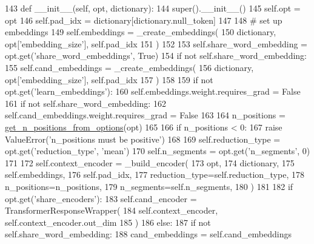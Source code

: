 \begin{DoxyCode}
143     \textcolor{keyword}{def }\_\_init\_\_(self, opt, dictionary):
144         super().\_\_init\_\_()
145         self.opt = opt
146         self.pad\_idx = dictionary[dictionary.null\_token]
147 
148         \textcolor{comment}{# set up embeddings}
149         self.embeddings = \_create\_embeddings(
150             dictionary, opt[\textcolor{stringliteral}{'embedding\_size'}], self.pad\_idx
151         )
152 
153         self.share\_word\_embedding = opt.get(\textcolor{stringliteral}{'share\_word\_embeddings'}, \textcolor{keyword}{True})
154         \textcolor{keywordflow}{if} \textcolor{keywordflow}{not} self.share\_word\_embedding:
155             self.cand\_embeddings = \_create\_embeddings(
156                 dictionary, opt[\textcolor{stringliteral}{'embedding\_size'}], self.pad\_idx
157             )
158 
159         \textcolor{keywordflow}{if} \textcolor{keywordflow}{not} opt.get(\textcolor{stringliteral}{'learn\_embeddings'}):
160             self.embeddings.weight.requires\_grad = \textcolor{keyword}{False}
161             \textcolor{keywordflow}{if} \textcolor{keywordflow}{not} self.share\_word\_embedding:
162                 self.cand\_embeddings.weight.requires\_grad = \textcolor{keyword}{False}
163 
164         n\_positions = \hyperlink{namespaceparlai_1_1agents_1_1transformer_1_1modules_ab67607512c597ddd54f2b60a1a1eaf4c}{get\_n\_positions\_from\_options}(opt)
165 
166         \textcolor{keywordflow}{if} n\_positions < 0:
167             \textcolor{keywordflow}{raise} ValueError(\textcolor{stringliteral}{'n\_positions must be positive'})
168 
169         self.reduction\_type = opt.get(\textcolor{stringliteral}{'reduction\_type'}, \textcolor{stringliteral}{'mean'})
170         self.n\_segments = opt.get(\textcolor{stringliteral}{'n\_segments'}, 0)
171 
172         self.context\_encoder = \_build\_encoder(
173             opt,
174             dictionary,
175             self.embeddings,
176             self.pad\_idx,
177             reduction\_type=self.reduction\_type,
178             n\_positions=n\_positions,
179             n\_segments=self.n\_segments,
180         )
181 
182         \textcolor{keywordflow}{if} opt.get(\textcolor{stringliteral}{'share\_encoders'}):
183             self.cand\_encoder = TransformerResponseWrapper(
184                 self.context\_encoder, self.context\_encoder.out\_dim
185             )
186         \textcolor{keywordflow}{else}:
187             \textcolor{keywordflow}{if} \textcolor{keywordflow}{not} self.share\_word\_embedding:
188                 cand\_embeddings = self.cand\_embeddings

\end{DoxyCode}
